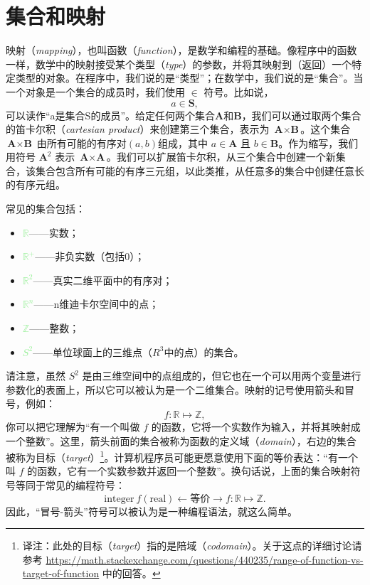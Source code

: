 \documentclass[lang=cn,12pt,marginpar=margintrue]{elegantbook}
\begin{document}
\section{集合和映射}

映射（\textit{mapping}），也叫函数（\textit{function}），是数学和编程的基础。像程序中的函数一样，数学中的映射接受某个类型（\textit{type}）的参数，并将其映射到（返回）一个特定类型的对象。在程序中，我们说的是“类型”；在数学中，我们说的是“集合”。当一个对象是一个集合的成员时，我们使用 $\in$ 符号。比如说，
\[
  a \in \textbf{S},
\]
可以读作“a是集合S的成员”。给定任何两个集合$\textbf{A}$和$\textbf{B}$，我们可以通过取两个集合的笛卡尔积（\textit{cartesian product}）来创建第三个集合，表示为 $\textbf{A} \times \textbf{B}$。这个集合 $\textbf{A} \times \textbf{B}$ 由所有可能的有序对$(a,b)$组成，其中 $a \in \textbf{A}$ 且 $b \in \textbf{B}$。作为缩写，我们用符号 $\textbf{A}^2$ 表示 $\textbf{A} \times \textbf{A}$。我们可以扩展笛卡尔积，从三个集合中创建一个新集合，该集合包含所有可能的有序三元组，以此类推，从任意多的集合中创建任意长的有序元组。

常见的集合包括：
\begin{itemize}
  \item \textcolor{lightgreen}{$\mathbb{R}$}——实数；
  \item \textcolor{lightgreen}{$\mathbb{R^+}$}——非负实数（包括0）；
  \item \textcolor{lightgreen}{$\mathbb{R}^2$}——真实二维平面中的有序对；
  \item \textcolor{lightgreen}{$\mathbb{R}^n$}——n维迪卡尔空间中的点；
  \item \textcolor{lightgreen}{$\mathbb{Z}$}——整数；
  \item \textcolor{lightgreen}{$S^2$}——单位球面上的三维点（$R^3$中的点）的集合。
\end{itemize}
请注意，虽然 $S^2$ 是由三维空间中的点组成的，但它也在一个可以用两个变量进行参数化的表面上，所以它可以被认为是一个二维集合。映射的记号使用箭头和冒号，例如：
\[
  f : \mathbb{R} \mapsto \mathbb{Z},
\]
你可以把它理解为“有一个叫做 $f$ 的函数，它将一个实数作为输入，并将其映射成一个整数”。这里，箭头前面的集合被称为函数的定义域（\textit{domain}），右边的集合被称为目标（\textit{target}）\footnote[1]{译注：此处的目标（\textit{target}）指的是陪域（\textit{codomain}）。关于这点的详细讨论请参考 \url{https://math.stackexchange.com/questions/440235/range-of-function-vs-target-of-function} 中的回答。}。计算机程序员可能更愿意使用下面的等价表达：“有一个叫 $f$ 的函数，它有一个实数参数并返回一个整数”。换句话说，上面的集合映射符号等同于常见的编程符号：
\[
  \text{integer} \ f(\text{real}) \leftarrow \text{等价} \rightarrow f : \mathbb{R} \mapsto \mathbb{Z}.
\]
因此，“冒号-箭头”符号可以被认为是一种编程语法，就这么简单。
\end{document}
